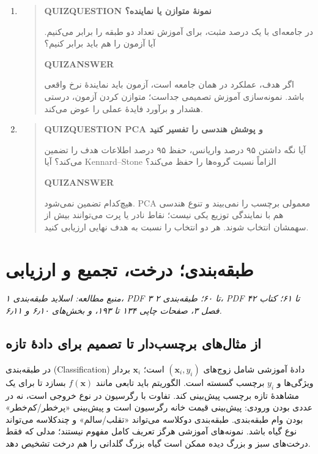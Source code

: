 \begin{enumerate}
\begin{quote}
\end{quote}
\item\begin{quote}\textbf{QUIZQUESTION نمونهٔ متوازن یا نماینده؟}\par 
در جامعه‌ای با یک درصد مثبت، برای آموزش تعداد دو طبقه را برابر می‌کنیم. آیا آزمون را هم باید برابر کنیم؟
\par\textbf{QUIZANSWER}\par اگر هدف، عملکرد در همان جامعه است، آزمون باید نمایندهٔ نرخ واقعی باشد. نمونه‌سازی آموزش تصمیمی جداست؛ متوازن کردن آزمون، درستی هشدار و برآورد فایدهٔ عملی را عوض می‌کند.\par 
\end{quote}
\item\begin{quote}\textbf{QUIZQUESTION PCA و پوشش هندسی را تفسیر کنید}\par 
آیا نگه داشتن ۹۵ درصد واریانس، حفظ ۹۵ درصد اطلاعات هدف را تضمین می‌کند؟ آیا Kennard--Stone الزاماً نسبت گروه‌ها را حفظ می‌کند؟
\par\textbf{QUIZANSWER}\par هیچ‌کدام تضمین نمی‌شود. PCA معمولی برچسب را نمی‌بیند و تنوع هندسی هم با نمایندگی توزیع یکی نیست؛ نقاط نادر یا پرت می‌توانند بیش از سهمشان انتخاب شوند. هر دو انتخاب را نسبت به هدف نهایی ارزیابی کنید.\par 
\end{quote}
\end{enumerate}


\chapter{طبقه‌بندی؛ درخت، تجمیع و ارزیابی}
\textit{منبع مطالعه: اسلاید طبقه‌بندی ۱، PDF ۳ تا ۶۰؛ طبقه‌بندی ۲، PDF ۴۲ تا ۶۱؛ کتاب فصل ۳، صفحات چاپی ۱۳۴ تا ۱۹۳، و بخش‌های ۶٫۱۰ و ۶٫۱۱.}\par 
\section{از مثال‌های برچسب‌دار تا تصمیم برای دادهٔ تازه}

در طبقه‌بندی (Classification) دادهٔ آموزشی شامل زوج‌های $(\mathbf x_i,y_i)$ است؛ $\mathbf x_i$ بردار ویژگی‌ها و $y_i$ برچسب گسسته است. الگوریتم باید تابعی مانند $f(\mathbf x)$ بسازد تا برای یک مشاهدهٔ تازه برچسب پیش‌بینی کند. تفاوت با رگرسیون در نوع خروجی است، نه در عددی بودن ورودی: پیش‌بینی قیمت خانه رگرسیون است و پیش‌بینی «پرخطر/کم‌خطر» بودن وام طبقه‌بندی. طبقه‌بندی دوکلاسه می‌تواند «تقلب/سالم» و چندکلاسه می‌تواند نوع گیاه باشد. نمونه‌های آموزشی هرگز تعریف کامل مفهوم نیستند؛ مدلی که فقط درخت‌های سبز و بزرگ دیده ممکن است گیاه بزرگ گلدانی را هم درخت تشخیص دهد.

